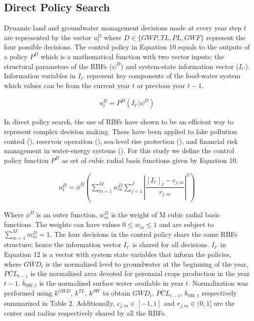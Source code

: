 \documentclass[11pt,a4paper]{article}
\begin{document}
\subsection{Direct Policy Search}

Dynamic land and groundwater management decisions made at every year step $t$ are represented by the vector $u_{t}^D$ where $D \in \{GWP,TL,PL,GWF\}$ represent the four possible decisions. The control policy in Equation 10 equals to the outputs of a policy $P^D$ which is a mathematical function with two vector inputs: the structural parameters of the RBFs ($\psi^D$) and system-state information vector ($I_{t'}$). Information variables in $I_{t'}$ represent key components of the food-water system which values can be from the current year $t$ or previous year $t-1$. 

\begin{align}
u_{t}^D = P^{D}(I_{t'}|\psi^{D})
\end{align}

In direct policy search, the use of RBFs have shown to be an efficient way to represent complex decision making. These have been applied to lake pollution control (\cite{quinn_direct_2017}), reservoir operation (\cite{giuliani_universal_2014, zatarain_salazar_balancing_2017}), sea-level rise protection (\cite{garner_using_2018}), and financial risk management in water-energy systems (\cite{gupta_can_2020,hamilton_stream_2022}). For this study we define the control policy function $P^D$ as set of cubic radial basis functions given by Equation 10.

\begin{align}
u_{t}^D = \phi^{D}\left(\sum_{m=1}^M w_{m}^D \sum_{j=1}^J \left\lvert\dfrac{[I_{t'}]_{j}-c_{j,m}}{r_{j,m}}\right\rvert^{3}\right)
\end{align}

Where $\phi^{D}$ is an outer function, $w_{m}^D$ is the weight of M cubic radial basis functions. The weights can have values $ 0 \leq w_{m} \leq 1$ and are subject to $\sum_{m=1}^M m_{m}^D= 1$. The four decisions in the control policy share the same RBFs structure; hence the information vector $I_{t'}$ is shared for all decisions. $I_{t'}$ in Equation 12 is a vector with system state variables that inform the policies, where $\overline{GWD}_{t}$ is the normalized level to groundwater at the beginning of the year, $\overline{PCL}_{t-1}$ is the normalized area devoted for perennial crops production in the year $t-1$. $\overline{b}_{SW,t}$ is the normalized surface water available in year $t$. Normalization was performed using $k^{GWD}$, $k^{TL}$, $k^{SW}$ to obtain $\overline{GWD}_{t}$, $\overline{PCL}_{t-1}$, $\overline{b}_{SW,t}$ respectively summarized in Table 2. Additionally, $c_{j,m} \in [-1,1]$ and $r_{j,m} \in (0,1]$ are the center and radius respectively shared by all the RBFs.
\end{document}
